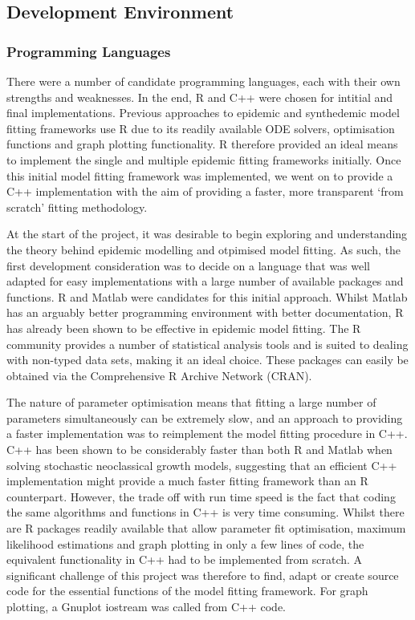 \documentclass[11pt, a4paper, oneside,titlepage]{article}
\begin{document}
\subsection{Development Environment}
\subsubsection{Programming Languages}
There were a number of candidate programming languages, each with
their own strengths and weaknesses. In the end, R and C++ were chosen
for intitial and final implementations. Previous
approaches to epidemic and synthedemic model fitting frameworks use R
due to its readily available ODE solvers, optimisation functions and
graph plotting functionality.\cite{marily2013,marily2014} R therefore
provided an ideal means to implement the single and multiple epidemic
fitting frameworks initially. Once this initial model fitting
framework was implemented, we went on to provide a C++ implementation
with the aim of providing a faster, more transparent `from scratch'
fitting methodology.

At the start of the project, it was desirable to begin exploring and
understanding the theory behind epidemic modelling and otpimised model
fitting. As such, the first development consideration was to decide on
a language that was well adapted for easy implementations with a large
number of available packages and functions. R and Matlab were
candidates for this initial approach. Whilst Matlab has an arguably
better programming environment with better documentation, R has
already been shown to be effective in epidemic model fitting. The R
community provides a number of statistical analysis tools and is suited to dealing with non-typed data
sets, making it an ideal choice. These packages can easily be obtained
via the Comprehensive R Archive Network (CRAN).

The nature of parameter optimisation means that fitting a large number
of parameters simultaneously can be extremely slow, and an approach to
providing a faster implementation was to reimplement the model fitting
procedure in C++. C++ has been shown to be considerably faster than
both R and Matlab when solving stochastic neoclassical growth models,
suggesting that an efficient C++ implementation might provide a much
faster fitting framework than an R counterpart.\cite{languagespeed}
However, the trade off with run time speed is the fact that coding the
same algorithms and functions in C++ is very time consuming. Whilst
there are R packages readily available that allow parameter fit optimisation,
maximum likelihood estimations and graph plotting in only a few lines
of code, the equivalent functionality in C++ had to be implemented
from scratch. A significant challenge of this project was therefore to
find, adapt or create source code for the essential functions of the
model fitting framework. For graph plotting, a Gnuplot iostream was called from C++
code. 
\end{document}
